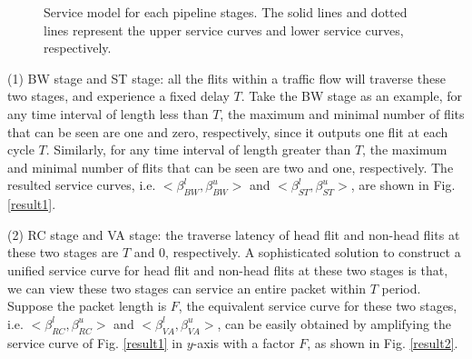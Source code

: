 \documentclass[10pt,journal]{IEEEtran}
\begin{document}
\begin{figure}
  \caption{Service model for each pipeline stages. The solid lines and dotted lines represent the upper service curves and lower service curves, respectively.}
\end{figure}

(1) BW stage and ST stage: all the flits within a traffic flow will traverse these two stages, and experience a fixed delay $T$. Take the BW stage as an example, for any time interval of length less than $T$, the maximum and minimal number of flits that can be seen are one and zero, respectively, since it outputs one flit at each cycle $T$. Similarly, for any time interval of length greater than $T$, the maximum and minimal number of flits that can be seen are two and one, respectively. The resulted service curves, i.e. $<\beta^l_{BW},\beta^u_{BW}>$ and $<\beta^l_{ST},\beta^u_{ST}>$, are shown in Fig. \ref{result1}.

(2) RC stage and VA stage: the traverse latency of head flit and non-head flits at these two stages are $T$ and 0, respectively. A sophisticated solution to construct a unified service curve for head flit and non-head flits at these two stages is that, we can view these two stages can service an entire packet within $T$ period. Suppose the packet length is $F$, the equivalent service curve for these two stages, i.e. $<\beta^l_{RC},\beta^u_{RC}>$ and $<\beta^l_{VA},\beta^u_{VA}>$, can be easily obtained by amplifying the service curve of Fig. \ref{result1} in $y$-axis with a factor $F$, as shown in Fig. \ref{result2}.
\end{document}
